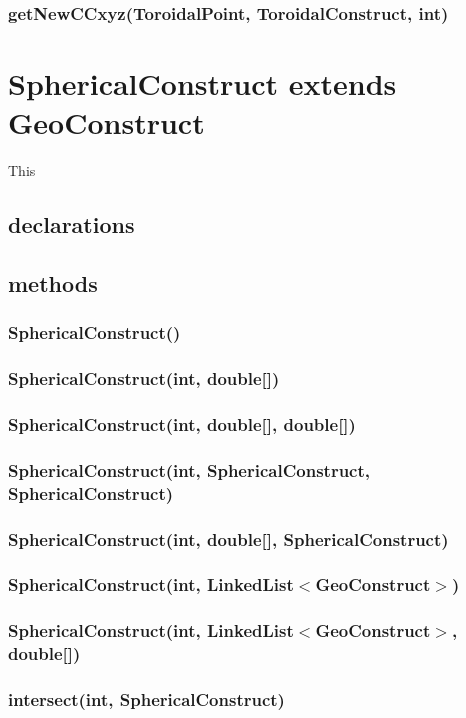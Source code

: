 \documentclass[a4paper,10pt]{report}
\begin{document}
\subsubsection{getNewCCxyz(ToroidalPoint, ToroidalConstruct, int)}
\section{SphericalConstruct extends GeoConstruct} This
\subsection{declarations}
\subsubsection{}
\subsection{methods}
\subsubsection{SphericalConstruct()}
\subsubsection{SphericalConstruct(int, double[])}
\subsubsection{SphericalConstruct(int, double[], double[])}
\subsubsection{SphericalConstruct(int, SphericalConstruct, SphericalConstruct)}
\subsubsection{SphericalConstruct(int, double[], SphericalConstruct)}
\subsubsection{SphericalConstruct(int, LinkedList$<$GeoConstruct$>$)}
\subsubsection{SphericalConstruct(int, LinkedList$<$GeoConstruct$>$, double[])}
\subsubsection{intersect(int, SphericalConstruct)}
\end{document}
